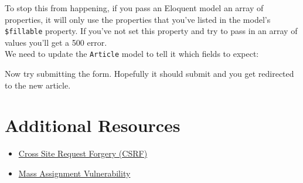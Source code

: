 To stop this from happening, if you pass an Eloquent model an array of properties, it will only use the properties that you've listed in the model's \texttt{\$fillable} property. If you've not set this property and try to pass in an array of values you'll get a 500 error.
\\

We need to update the \texttt{Article} model to tell it which fields to expect:


Now try submitting the form. Hopefully it should submit and you get redirected to the new article.


\section{Additional Resources}

\begin{itemize}[leftmargin=*]
    \item \href{https://owasp.org/www-community/attacks/csrf}{Cross Site Request Forgery (CSRF)}
    \item \href{https://cheatsheetseries.owasp.org/cheatsheets/Mass_Assignment_Cheat_Sheet.html}{Mass Assignment Vulnerability}
\end{itemize}
